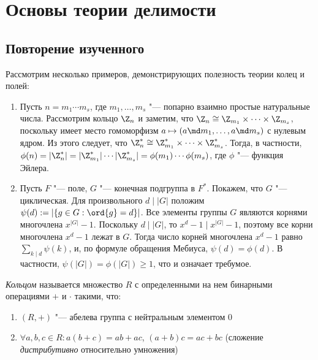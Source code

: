 \section{Основы теории делимости}

\subsection{Повторение изученного}

\begin{example}
	Рассмотрим несколько примеров, демонстрирующих полезность теории колец и полей:
	\begin{enumerate}
		\item Пусть $n = m_1 \dotsm m_s$, где $m_1, \dotsc, m_s$ "--- попарно взаимно простые натуральные числа. Рассмотрим кольцо $\Z_n$ и заметим, что $\Z_n \cong \Z_{m_1} \times \dotsb \times \Z_{m_s}$, поскольку имеет место гомоморфизм $a \mapsto (a \md m_1, \dotsc, a \md m_s)$ с нулевым ядром. Из этого следует, что $\Z_n^* \cong \Z_{m_1}^* \times \dotsb \times \Z_{m_s}^*$. Тогда, в частности, $\phi(n) =  |\Z_n^*| = |\Z_{m_1}^*|\dotsm|\Z_{m_s}^*| = \phi(m_1)\dotsm\phi(m_s)$, где $\phi$ "--- функция Эйлера.
		\item Пусть $F$ "--- поле, $G$ "--- конечная подгруппа в $F^*$. Покажем, что $G$ "--- циклическая. Для произвольного $d\mid |G|$ положим $\psi(d) := |\{g \in G: \ord{g} = d\}|$. Все элементы группы $G$ являются корнями многочлена $x^{|G|} - 1$. Поскольку $d\mid |G|$, то $x^{d} - 1 \mid x^{|G|} - 1$, поэтому все корни многочлена $x^d - 1$ лежат в $G$. Тогда число корней многочлена $x^d - 1$ равно $\sum_{k \mid d} \psi(k)$, и, по формуле обращения Мебиуса, $\psi(d) = \phi(d)$. В частности, $\psi(|G|) = \phi(|G|) \ge 1$, что и означает требумое.
	\end{enumerate}
\end{example}

\begin{definition}
	\textit{Кольцом} называется множество $R$ с определенными на нем бинарными операциями $+$ и $\cdot$ такими, что:
	\begin{enumerate}
		\item $(R, +)$ "--- абелева группа с нейтральным элементом 0
		\item $\forall a, b, c \in R: a(b + c) = ab + ac$, $(a + b)c = ac + bc$ (сложение \textit{дистрибутивно} относительно умножения)
	\end{enumerate}
\end{definition}

